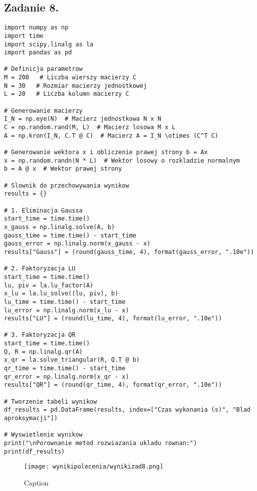 \documentclass{article}
\begin{document}
\subsection{Zadanie 8.}
\begin{lstlisting}
import numpy as np
import time
import scipy.linalg as la
import pandas as pd

# Definicja parametrow
M = 200   # Liczba wierszy macierzy C
N = 30   # Rozmiar macierzy jednostkowej
L = 20   # Liczba kolumn macierzy C

# Generowanie macierzy
I_N = np.eye(N)  # Macierz jednostkowa N x N
C = np.random.rand(M, L)  # Macierz losowa M x L
A = np.kron(I_N, C.T @ C)  # Macierz A = I_N \otimes (C^T C)

# Generowanie wektora x i obliczenie prawej strony b = Ax
x = np.random.randn(N * L)  # Wektor losowy o rozkladzie normalnym
b = A @ x  # Wektor prawej strony

# Slownik do przechowywania wynikow
results = {}

# 1. Eliminacja Gaussa
start_time = time.time()
x_gauss = np.linalg.solve(A, b)
gauss_time = time.time() - start_time
gauss_error = np.linalg.norm(x_gauss - x)
results["Gauss"] = (round(gauss_time, 4), format(gauss_error, ".10e"))

# 2. Faktoryzacja LU
start_time = time.time()
lu, piv = la.lu_factor(A)
x_lu = la.lu_solve((lu, piv), b)
lu_time = time.time() - start_time
lu_error = np.linalg.norm(x_lu - x)
results["LU"] = (round(lu_time, 4), format(lu_error, ".10e"))

# 3. Faktoryzacja QR
start_time = time.time()
Q, R = np.linalg.qr(A)
x_qr = la.solve_triangular(R, Q.T @ b)
qr_time = time.time() - start_time
qr_error = np.linalg.norm(x_qr - x)
results["QR"] = (round(qr_time, 4), format(qr_error, ".10e"))

# Tworzenie tabeli wynikow
df_results = pd.DataFrame(results, index=["Czas wykonania (s)", "Blad aproksymacji"])

# Wyswietlenie wynikow
print("\nPorownanie metod rozwiazania ukladu rownan:")
print(df_results)
\end{lstlisting}
\begin{figure}[h]
    \centering
    \texttt{[image: wynikipolecenia/wynikizad8.png]}
    \caption{Caption}
    \label{zad8wyniki}
\end{figure}
\end{document}
